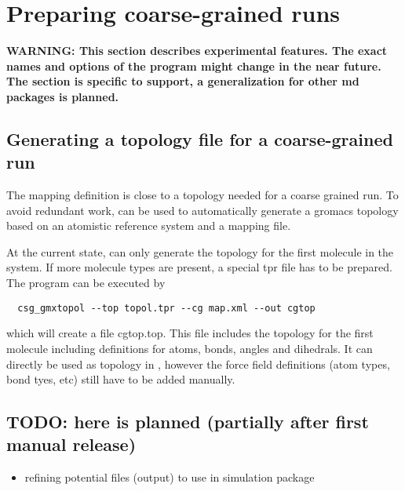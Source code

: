 \chapter{Preparing coarse-grained runs}
\label{sec:usage:cgrun}
\textbf{WARNING: This section describes experimental features. The exact names and options of the program might change in the near future.  The section is specific to \gromacs support, a generalization for other md packages is planned.}

\section{Generating a topology file for a coarse-grained run}
The mapping definition is close to a topology needed for a coarse grained run. To avoid redundant work,  can be used to automatically generate a gromacs topology based on an atomistic reference system and a mapping file.

At the current state,  can only generate the topology for the first molecule in the system. If more molecule types are present, a special tpr file has to be prepared. The program can be executed by
\begin{verbatim}
  csg_gmxtopol --top topol.tpr --cg map.xml --out cgtop
\end{verbatim}
which will create a file cgtop.top. This file includes the topology for the first molecule including definitions for atoms, bonds, angles and dihedrals. It can directly be used as topology in \gromacs , however the force field definitions (atom types, bond tyes, etc) still have to be added manually.

\section{TODO: here is planned (partially after first manual release)}
\begin{itemize}
  \item refining potential files (\votca output) to use in simulation package
\end{itemize}